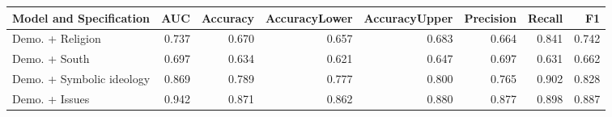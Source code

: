 \begin{table}[H]
\centering
\begin{tabular}{lrrrrrrr}
  \toprule
Model and Specification & AUC & Accuracy & AccuracyLower & AccuracyUpper & Precision & Recall & F1 \\ 
  \midrule
Demo. + Religion & 0.737 & 0.670 & 0.657 & 0.683 & 0.664 & 0.841 & 0.742 \\ 
  Demo. + South & 0.697 & 0.634 & 0.621 & 0.647 & 0.697 & 0.631 & 0.662 \\ 
  Demo. + Symbolic ideology & 0.869 & 0.789 & 0.777 & 0.800 & 0.765 & 0.902 & 0.828 \\ 
  Demo. + Issues & 0.942 & 0.871 & 0.862 & 0.880 & 0.877 & 0.898 & 0.887 \\ 
   \bottomrule
\end{tabular}
\end{table}
